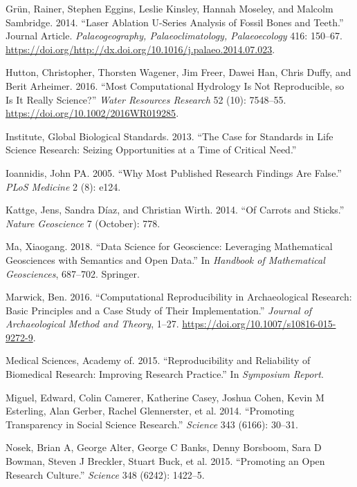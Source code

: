 \documentclass[]{elsarticle} %
\begin{document}
\leavevmode\hypertarget{ref-Gruen2014}{}%
Grün, Rainer, Stephen Eggins, Leslie Kinsley, Hannah Moseley, and Malcolm Sambridge. 2014. ``Laser Ablation U-Series Analysis of Fossil Bones and Teeth.'' Journal Article. \emph{Palaeogeography, Palaeoclimatology, Palaeoecology} 416: 150--67. \url{https://doi.org/http://dx.doi.org/10.1016/j.palaeo.2014.07.023}.

\leavevmode\hypertarget{ref-Hutton_et_al_2016}{}%
Hutton, Christopher, Thorsten Wagener, Jim Freer, Dawei Han, Chris Duffy, and Berit Arheimer. 2016. ``Most Computational Hydrology Is Not Reproducible, so Is It Really Science?'' \emph{Water Resources Research} 52 (10): 7548--55. \url{https://doi.org/10.1002/2016WR019285}.

\leavevmode\hypertarget{ref-global2013case}{}%
Institute, Global Biological Standards. 2013. ``The Case for Standards in Life Science Research: Seizing Opportunities at a Time of Critical Need.''

\leavevmode\hypertarget{ref-ioannidis2005most}{}%
Ioannidis, John PA. 2005. ``Why Most Published Research Findings Are False.'' \emph{PLoS Medicine} 2 (8): e124.

\leavevmode\hypertarget{ref-Kattge_Duxedaz_Wirth_2014}{}%
Kattge, Jens, Sandra Díaz, and Christian Wirth. 2014. ``Of Carrots and Sticks.'' \emph{Nature Geoscience} 7 (October): 778.

\leavevmode\hypertarget{ref-ma2018data}{}%
Ma, Xiaogang. 2018. ``Data Science for Geoscience: Leveraging Mathematical Geosciences with Semantics and Open Data.'' In \emph{Handbook of Mathematical Geosciences}, 687--702. Springer.

\leavevmode\hypertarget{ref-Marwick2016repro}{}%
Marwick, Ben. 2016. ``Computational Reproducibility in Archaeological Research: Basic Principles and a Case Study of Their Implementation.'' \emph{Journal of Archaeological Method and Theory}, 1--27. \url{https://doi.org/10.1007/s10816-015-9272-9}.

\leavevmode\hypertarget{ref-academy2015reproducibility}{}%
Medical Sciences, Academy of. 2015. ``Reproducibility and Reliability of Biomedical Research: Improving Research Practice.'' In \emph{Symposium Report}.

\leavevmode\hypertarget{ref-miguel2014promoting}{}%
Miguel, Edward, Colin Camerer, Katherine Casey, Joshua Cohen, Kevin M Esterling, Alan Gerber, Rachel Glennerster, et al. 2014. ``Promoting Transparency in Social Science Research.'' \emph{Science} 343 (6166): 30--31.

\leavevmode\hypertarget{ref-nosek2015promoting}{}%
Nosek, Brian A, George Alter, George C Banks, Denny Borsboom, Sara D Bowman, Steven J Breckler, Stuart Buck, et al. 2015. ``Promoting an Open Research Culture.'' \emph{Science} 348 (6242): 1422--5.
\end{document}
